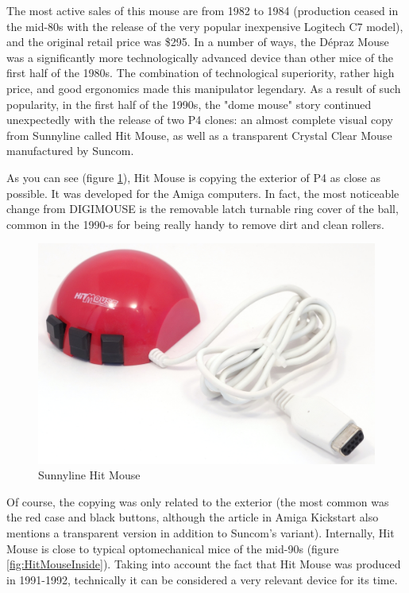 \documentclass[11pt, a4paper]{article}
\begin{document}
The most active sales of this mouse are from 1982 to 1984 (production ceased in the mid-80s with the release of the very popular inexpensive Logitech C7 model), and the original retail price was \$295. In a number of ways, the D\'epraz Mouse was a significantly more technologically advanced device than other mice of the first half of the 1980s. The combination of technological superiority, rather high price, and good ergonomics made this manipulator legendary. As a result of such popularity, in the first half of the 1990s, the "dome mouse" story continued unexpectedly with the release of two P4 clones: an almost complete visual copy from Sunnyline called Hit Mouse\cite{sunnyline}, as well as a transparent Crystal Clear Mouse manufactured by Suncom\cite{suncom}.

As you can see (figure \ref{fig:HitMousePic}), Hit Mouse is copying the exterior of P4 as close as possible. It was developed for the Amiga computers. In fact, the most noticeable change from DIGIMOUSE is the removable latch turnable ring cover of the ball, common in the 1990-s for being really handy to remove dirt and clean rollers.

\begin{figure}[h]
   \centering
    \includegraphics[scale=0.5]{1982_depraz_digimouse/hitmouse_pic_30.jpg}
    \caption{Sunnyline Hit Mouse}
    \label{fig:HitMousePic}
\end{figure}

Of course, the copying was only related to the exterior (the most common was the red case and black buttons, although the article in Amiga Kickstart also mentions \cite{sunnyline} a transparent version in addition to Suncom's variant). Internally, Hit Mouse is close to typical optomechanical mice of the mid-90s (figure \ref{fig:HitMouseInside}). Taking into account the fact that Hit Mouse was produced in 1991-1992, technically it can be considered a very relevant device for its time.
\end{document}
